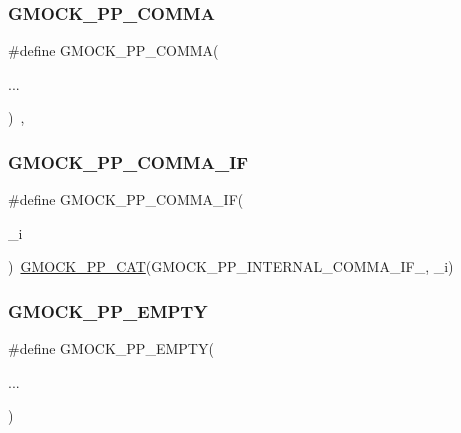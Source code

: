 \subsubsection{\texorpdfstring{GMOCK\_PP\_COMMA}{GMOCK\_PP\_COMMA}}
{\footnotesize\ttfamily \#define G\+M\+O\+C\+K\+\_\+\+P\+P\+\_\+\+C\+O\+M\+MA(\begin{DoxyParamCaption}\item[{}]{... }\end{DoxyParamCaption})~,}

\mbox{\label{_obj__test_2lib_2googletest-master_2googlemock_2include_2gmock_2internal_2gmock-pp_8h_acad3f789b483c40204f25a56c3342103}} 
\subsubsection{\texorpdfstring{GMOCK\_PP\_COMMA\_IF}{GMOCK\_PP\_COMMA\_IF}}
{\footnotesize\ttfamily \#define G\+M\+O\+C\+K\+\_\+\+P\+P\+\_\+\+C\+O\+M\+M\+A\+\_\+\+IF(\begin{DoxyParamCaption}\item[{}]{\+\_\+i }\end{DoxyParamCaption})~\mbox{\hyperlink{_obj__test_2lib_2googletest-master_2googlemock_2include_2gmock_2internal_2gmock-pp_8h_a108c52ffa81ab99348d23b8fa76fded3}{G\+M\+O\+C\+K\+\_\+\+P\+P\+\_\+\+C\+AT}}(G\+M\+O\+C\+K\+\_\+\+P\+P\+\_\+\+I\+N\+T\+E\+R\+N\+A\+L\+\_\+\+C\+O\+M\+M\+A\+\_\+\+I\+F\+\_\+, \+\_\+i)}

\mbox{\label{_obj__test_2lib_2googletest-master_2googlemock_2include_2gmock_2internal_2gmock-pp_8h_a7dc39000427944f011a62b2aa915fc2a}} 
\subsubsection{\texorpdfstring{GMOCK\_PP\_EMPTY}{GMOCK\_PP\_EMPTY}}
{\footnotesize\ttfamily \#define G\+M\+O\+C\+K\+\_\+\+P\+P\+\_\+\+E\+M\+P\+TY(\begin{DoxyParamCaption}\item[{}]{... }\end{DoxyParamCaption})}

